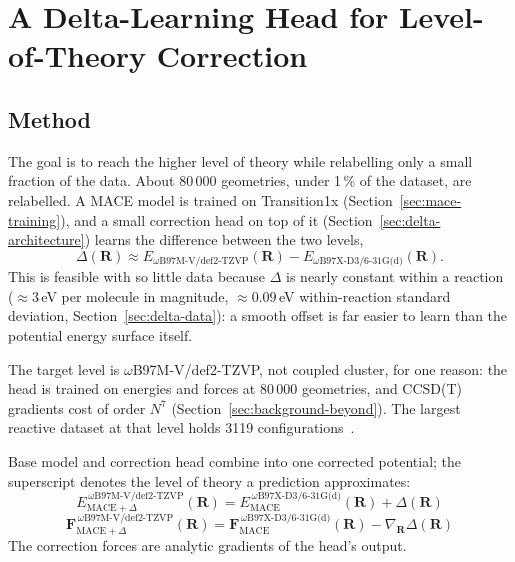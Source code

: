 \usetikzlibrary{positioning, arrows.meta}

\chapter{A Delta-Learning Head for Level-of-Theory Correction}
\label{ch:delta}

\section{Method}
\label{sec:delta-overview}

The goal is to reach the higher level of theory while relabelling only
a small fraction of the data. About 80\,000 geometries, under 1\,\% of
the dataset, are relabelled. A MACE model is trained on Transition1x
(Section~\ref{sec:mace-training}), and a small correction head on top
of it (Section~\ref{sec:delta-architecture}) learns the difference
between the two levels,
%
\begin{equation}
\Delta(\mathbf{R}) \approx E_{\omega\text{B97M-V/def2-TZVP}}(\mathbf{R}) - E_{\omega\text{B97X-D3/6-31G(d)}}(\mathbf{R}) .
\label{eq:delta-def}
\end{equation}
%
This is feasible with so little data because $\Delta$ is nearly
constant within a reaction ($\approx 3$\,eV per molecule in magnitude,
$\approx 0.09$\,eV within-reaction standard deviation,
Section~\ref{sec:delta-data}): a smooth offset is far easier to learn
than the potential energy surface itself.

The target level is \mbox{$\omega$B97M-V/def2-TZVP}, not coupled
cluster, for one reason: the head is trained on energies and forces at
80\,000 geometries, and CCSD(T) gradients cost of order $N^7$
(Section~\ref{sec:background-beyond}). The largest reactive dataset at
that level holds 3119 configurations~\cite{allen2026}.

Base model and correction head combine into one corrected potential;
the superscript denotes the level of theory a prediction approximates:
%
\begin{equation}
E_{\text{MACE}+\Delta}^{\,\omega\text{B97M-V/def2-TZVP}}(\mathbf{R})
=
E_{\text{MACE}}^{\,\omega\text{B97X-D3/6-31G(d)}}(\mathbf{R})
+ \Delta(\mathbf{R})
\label{eq:delta-energy}
\end{equation}
%
\begin{equation}
\mathbf{F}_{\text{MACE}+\Delta}^{\,\omega\text{B97M-V/def2-TZVP}}(\mathbf{R})
=
\mathbf{F}_{\text{MACE}}^{\,\omega\text{B97X-D3/6-31G(d)}}(\mathbf{R})
- \nabla_{\mathbf{R}}\Delta(\mathbf{R})
\label{eq:delta-forces}
\end{equation}
%
The correction forces are analytic gradients of the head's output.

